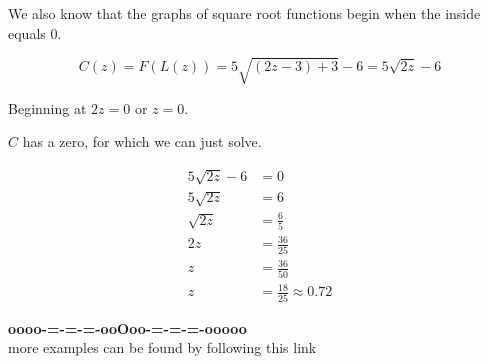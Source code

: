 \documentclass{ximera}
\begin{document}
\begin{example}
\begin{image}
\end{image}





We also know that the graphs of square root functions begin when the inside equals $0$. 

\[
C(z) = F(L(z)) = 5 \sqrt{(2z - 3) + 3} - 6 = 5 \sqrt{2z} - 6
\]


Beginning at $2z = 0$ or $z = 0$. 

$C$ has a zero, for which we can just solve.




\begin{align*}
5 \sqrt{2z} - 6 &= 0 \\
5 \sqrt{2z}     &= 6 \\
\sqrt{2z}       &= \frac{6}{5} \\
2z            &= \frac{36}{25}  \\
z                  &= \frac{36}{50} \\
z                 &= \frac{18}{25} \approx 0.72
\end{align*}




\end{example}





















\begin{onlineOnly}
\begin{center}
\textbf{\textcolor{green!50!black}{oooo-=-=-=-ooOoo-=-=-=-ooooo}} \\

more examples can be found by following this link\\ 

\end{center}
\end{onlineOnly}
\end{document}
